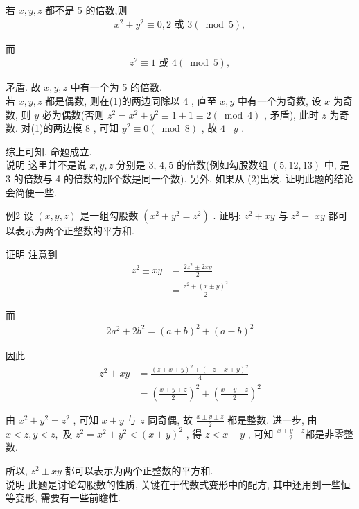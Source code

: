 	若 $x ,  y ,  z$ 都不是 5 的倍数,则
\begin{align*}
		x^{2}+y^{2} \equiv 0,2 \text { 或 } 3(\bmod 5),
	\end{align*}

	而
\begin{align*}
		z^{2} \equiv 1 \text { 或 } 4(\bmod 5) ,
	\end{align*}

	矛盾. 故 $x ,  y ,  z$ 中有一个为 5 的倍数. \\
	若 $x ,  y ,  z$ 都是偶数, 则在(1)的两边同除以 4 , 直至 $x ,  y$ 中有一个为奇数, 设 $x$ 为奇数, 则 $y$ 必为偶数(否则 $z^{2}=x^{2}+y^{2} \equiv 1+1 \equiv 2(\bmod 4)$ , 矛盾), 此时 $z$ 为奇数. 对(1)的两边模 8 , 可知 $y^{2} \equiv 0(\bmod 8)$ , 故 $4 \mid y$ .

	综上可知, 命题成立. \\
	说明 这里并不是说 $x ,  y ,  z$ 分别是 3,  $4 ,  5$ 的倍数(例如勾股数组 $(5,12,13)$ 中, 是 3 的倍数与 4 的倍数的那个数是同一个数). 另外, 如果从 (2)出发, 证明此题的结论会简便一些.

	例2 设 $(x, y, z)$ 是一组勾股数 $\left(x^{2}+y^{2}=z^{2}\right)$ . 证明: $z^{2}+x y$ 与 $z^{2}-$ $x y$ 都可以表示为两个正整数的平方和.

	证明 注意到\begin{align}
		z^{2} \pm x y & =\frac{2 z^{2} \pm 2 x y}{2}   \\
		              & =\frac{z^{2}+(x \pm y)^{2}}{2}
	\end{align}

	而
\begin{align*}
		2 a^{2}+2 b^{2}=(a+b)^{2}+(a-b)^{2}
	\end{align*}

	因此\begin{align}
		z^{2} \pm x y & =\frac{(z+x \pm y)^{2}+(-z+x \pm y)^{2}}{4}                                \\
		              & =\left(\frac{x \pm y+z}{2}\right)^{2}+\left(\frac{x \pm y-z}{2}\right)^{2}
	\end{align}

	由 $x^{2}+y^{2}=z^{2}$ , 可知 $x \pm y$ 与 $z$ 同奇偶, 故 $\frac{x \pm y \pm z}{2}$ 都是整数. 进一步, 由 $x<z, y<z , $ 及 $z^{2}=x^{2}+y^{2}<(x+y)^{2}$ , 得 $z<x+y$ , 可知 $\frac{x \pm y \pm z}{2}$都是非零整数.

	所以,  $z^{2} \pm x y$ 都可以表示为两个正整数的平方和. \\
	说明 此题是讨论勾股数的性质, 关键在于代数式变形中的配方, 其中还用到一些恒等变形, 需要有一些前瞻性.

